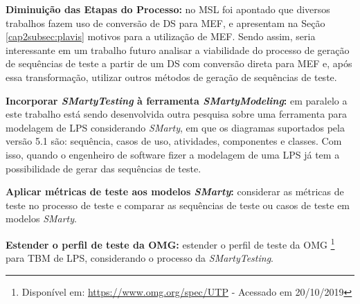 \textbf{Diminuição das Etapas do Processo:} no MSL foi apontado que diversos trabalhos fazem uso de conversão de DS para MEF, e \citet{pinheiro2012jplavisfsm} apresentam na Seção \ref{cap2subsec:plavis} motivos para a utilização de MEF. Sendo assim, seria interessante em um trabalho futuro analisar a viabilidade do processo de geração de sequências de teste a partir de um DS com conversão direta para MEF e, após essa transformação, utilizar outros métodos de geração de sequências de teste.

\textbf{Incorporar \textit{SMartyTesting} à ferramenta \textit{SMartyModeling}:} em paralelo a este trabalho está sendo desenvolvida outra pesquisa sobre uma ferramenta para modelagem de LPS considerando \textit{SMarty}, em que os diagramas suportados pela versão 5.1 são: sequência, casos de uso, atividades, componentes e classes. Com isso, quando o engenheiro de software fizer a modelagem de uma LPS já tem a possibilidade de gerar das sequências de teste.

\textbf{Aplicar métricas de teste aos modelos \textit{SMarty}:} considerar as métricas de teste no processo de teste e comparar as sequências de teste ou casos de teste em modelos \textit{SMarty}.

\textbf{Estender o perfil de teste da OMG:} estender o perfil de teste da OMG \footnote{Disponível em: \url{https://www.omg.org/spec/UTP} - Acessado em 20/10/2019} \cite{Bagnato_et_al2013} para TBM de LPS, considerando o processo da \textit{SMartyTesting}.   


